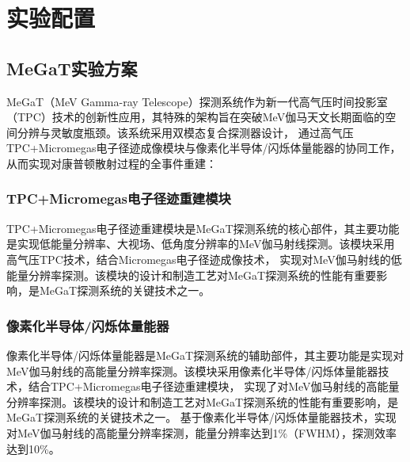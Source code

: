 \chapter{实验配置}
\label{chap:inverseproblem}
\section{MeGaT实验方案}
MeGaT（MeV Gamma-ray Telescope）探测系统作为新一代高气压时间投影室（TPC）技术的创新性应用，其特殊的架构旨在突破MeV伽马天文长期面临的空间分辨与灵敏度瓶颈。该系统采用双模态复合探测器设计，
通过高气压TPC+Micromegas电子径迹成像模块与像素化半导体/闪烁体量能器的协同工作，从而实现对康普顿散射过程的全事件重建：
\subsection{TPC+Micromegas电子径迹重建模块}
	TPC+Micromegas电子径迹重建模块是MeGaT探测系统的核心部件，其主要功能是实现低能量分辨率、大视场、低角度分辨率的MeV伽马射线探测。该模块采用高气压TPC技术，结合Micromegas电子径迹成像技术，
	实现对MeV伽马射线的低能量分辨率探测。该模块的设计和制造工艺对MeGaT探测系统的性能有重要影响，是MeGaT探测系统的关键技术之一。\par
\subsection{像素化半导体/闪烁体量能器}
	像素化半导体/闪烁体量能器是MeGaT探测系统的辅助部件，其主要功能是实现对MeV伽马射线的高能量分辨率探测。该模块采用像素化半导体/闪烁体量能器技术，结合TPC+Micromegas电子径迹重建模块，
	实现了对MeV伽马射线的高能量分辨率探测。该模块的设计和制造工艺对MeGaT探测系统的性能有重要影响，是MeGaT探测系统的关键技术之一。
	基于像素化半导体/闪烁体量能器技术，实现对MeV伽马射线的高能量分辨率探测，能量分辨率达到1\%（FWHM），探测效率达到10\%。\par

